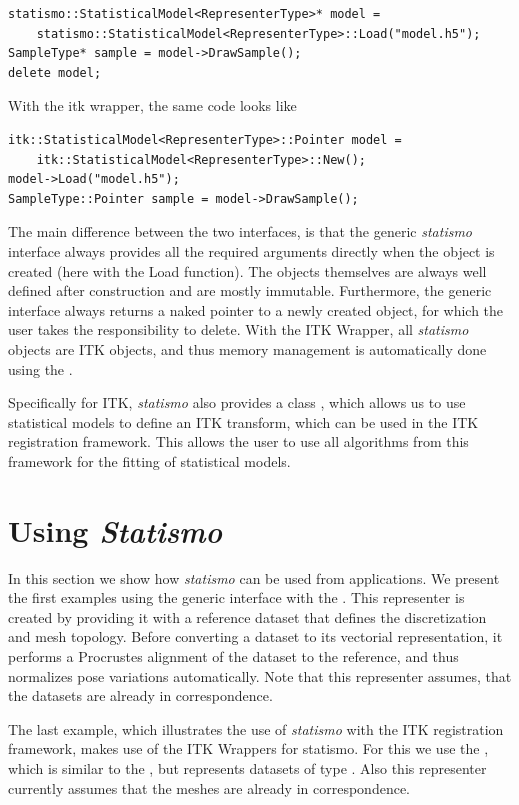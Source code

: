 \documentclass{InsightArticle}
\newcommand{\statismo}{\emph{statismo}\xspace}
\newcommand{\Statismo}{\emph{Statismo}\xspace}
\begin{document}
\begin{verbatim}
statismo::StatisticalModel<RepresenterType>* model = 
    statismo::StatisticalModel<RepresenterType>::Load("model.h5");
SampleType* sample = model->DrawSample();
delete model;
\end{verbatim}
With the itk wrapper, the same code looks like
\begin{verbatim}
itk::StatisticalModel<RepresenterType>::Pointer model = 
    itk::StatisticalModel<RepresenterType>::New();
model->Load("model.h5");
SampleType::Pointer sample = model->DrawSample();
\end{verbatim}
The main difference between the two interfaces, is that the generic \statismo interface 
always provides all the required arguments directly when the object is created
(here with the Load function).
The objects themselves are always well defined after construction and are mostly
immutable.
Furthermore, the generic interface always returns a naked pointer to a newly created object, for which 
the user takes the responsibility to delete. With the ITK Wrapper, all \statismo objects are  ITK objects, and thus 
memory management is automatically done using the . 

Specifically for ITK, \statismo also provides a class , which 
allows us to use statistical models to define an ITK transform, which can be used in the ITK registration 
framework. This allows the user to use all algorithms from this framework for the fitting of statistical models. 


\section{Using \Statismo}
In this section we show how \statismo can be used from applications. We present the first examples using the generic 
interface with the . This representer is created by providing it with a reference dataset that 
defines the discretization and mesh topology. Before converting a dataset to its vectorial representation, it performs a Procrustes alignment
\cite{TODO} of the dataset to the reference, and thus normalizes pose variations automatically. Note that this representer assumes, that the datasets are already in correspondence. 

The last example, which illustrates the use of \statismo with the ITK
registration framework, makes use of the ITK Wrappers for statismo. For this we use the , which is similar to the , but represents
datasets of type . Also this representer currently assumes that the meshes are already in correspondence. 
\end{document}
